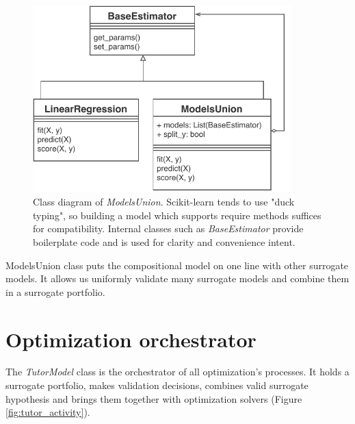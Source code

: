     \begin{figure}
        \centering
        \includegraphics[width=10cm]{content/images/munion_class}
        \caption[Models-union class]{Class diagram of \textit{ModelsUnion}. Scikit-learn tends to use "duck typing", so building a model which supports require methods suffices for compatibility. Internal classes such as \textit{BaseEstimator} provide boilerplate code and is used for clarity and convenience intent.} 
        \label{fig:munion} 
    \end{figure}  

    ModelsUnion class puts the compositional model on one line with other surrogate models. It allows us uniformly validate many surrogate models and combine them in a surrogate portfolio.

\section{Optimization orchestrator}
    The \textit{TutorModel} class is the orchestrator of all optimization's processes. It holds a surrogate portfolio, makes validation decisions, combines valid surrogate hypothesis and brings them together with optimization solvers (Figure \ref{fig:tutor_activity}).



